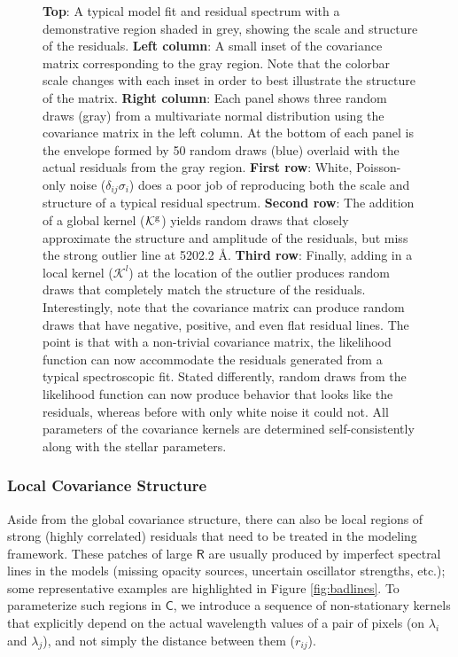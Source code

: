 \documentclass[iop,floatfix]{emulateapj}
\newcommand{\vR}{\mathsf{R}}
\newcommand{\vC}{\mathsf{C}}
\begin{document}
\begin{figure}[!htb]
\begin{center}
\caption{\textbf{Top}: A typical model fit and residual spectrum with a demonstrative region shaded in grey, showing the scale and structure of the residuals. \textbf{Left column}: A small inset of the covariance matrix corresponding to the gray region. Note that the colorbar scale changes with each inset in order to best illustrate the structure of the matrix. \textbf{Right column}: Each panel shows three random draws (gray) from a multivariate normal distribution using the covariance matrix in the left column. At the bottom of each panel is the envelope formed by 50 random draws (blue) overlaid with the actual residuals from the gray region. \textbf{First row}: White, Poisson-only noise ($\delta_{ij}\sigma_i$) does a poor job of reproducing both the scale and structure of a typical residual spectrum. \textbf{Second row}: The addition of a global kernel ($\mathcal{K}^{\rm g}$) yields random draws that closely approximate the structure and amplitude of the residuals, but miss the strong outlier line at 5202.2 \AA. \textbf{Third row}: Finally, adding in a local kernel ($\mathcal{K}^l$) at the location of the outlier produces random draws that completely match the structure of the residuals. Interestingly, note that the covariance matrix can produce random draws that have negative, positive, and even flat residual lines. The point is that with a non-trivial covariance matrix, the likelihood function can now accommodate the residuals generated from a typical spectroscopic fit. Stated differently, random draws from the likelihood function can now produce behavior that looks like the residuals, whereas before with only white noise it could not. All parameters of the covariance kernels are determined self-consistently along with the stellar parameters. }
\label{fig:matrix}
\end{center}
\end{figure}

\subsubsection{Local Covariance Structure} \label{subsec:local_covariance}

Aside from the global covariance structure, there can also be local regions of strong (highly 
correlated) residuals that need to be treated in the modeling framework.  These patches of large 
$\vR$ are usually produced by imperfect spectral lines in the models (missing opacity sources, 
uncertain oscillator strengths, etc.); some representative examples are highlighted in Figure 
\ref{fig:badlines}.  To parameterize such regions in $\vC$, we introduce a sequence of 
non-stationary kernels that explicitly depend on the actual wavelength values of a pair of pixels 
(on $\lambda_i$ and $\lambda_j$), and not simply the distance between them ($r_{ij}$).  
\end{document}
